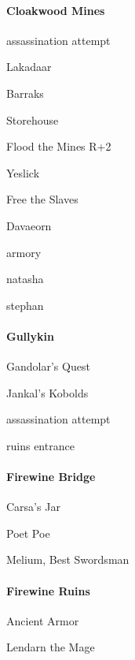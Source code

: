 \documentclass[10pt,a4,twoside]{book}
\begin{document}
\begin{multicols}{3}
\paragraph*{Cloakwood Mines} %
\begin{trivlist}
\item assassination attempt
\item Lakadaar
\item Barraks
\item Storehouse
\item Flood the Mines {\textcolor{OliveGreen}{R+2}}
\item Yeslick
\item Free the Slaves
\item Davaeorn
\item armory
\item natasha
\item stephan
\end{trivlist}

\paragraph*{Gullykin}
\begin{trivlist}
\item Gandolar's Quest
\item Jankal's Kobolds
\item assassination attempt
\item ruins entrance
\end{trivlist}

\paragraph*{Firewine Bridge}
\begin{trivlist}
\item Carsa's Jar
\item Poet Poe
\item Melium, Best Swordsman
\end{trivlist}

\paragraph*{Firewine Ruins}
\begin{trivlist}
\item Ancient Armor
\item Lendarn the Mage
\end{trivlist}


\end{multicols}
\end{document}
